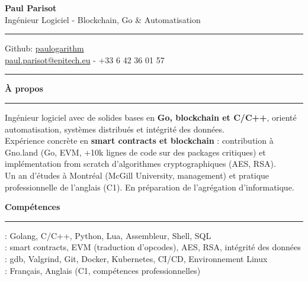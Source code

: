 \documentclass[9pt]{extarticle}
\begin{document}
\begin{center}
	{\huge\bfseries Paul Parisot}
	\\[4pt]
	{\Large Ingénieur Logiciel - Blockchain, Go \& Automatisation}
	\\
\end{center}

\par\vspace{-5pt}
\rule{\linewidth}{0.4pt}
\par\vspace{-5pt}

\begin{center}
	Github: \href{https://github.com/paulogarithm}{paulogarithm}
	\\
	\href{mailto:paul.parisot@epitech.eu}{paul.parisot@epitech.eu} - +33 6 42 36 01 57
	\\
\end{center}

\par\vspace{-10pt}
\rule{\linewidth}{0.4pt}
\par\vspace{7pt}

{\large\bfseries À propos}
\par\vspace{-8pt}
\rule{\linewidth}{0.4pt}
\par\vspace{5pt}

Ingénieur logiciel avec de solides bases en {\bfseries Go, blockchain et C/C++}, orienté automatisation, systèmes distribués et intégrité des données.
\\
Expérience concrète en {\bfseries smart contracts et blockchain} : contribution à Gno.land (Go, EVM, +10k lignes de code sur des packages critiques) et implémentation from scratch d'algorithmes cryptographiques (AES, RSA).
\\
Un an d'études à Montréal (McGill University, management) et pratique professionnelle de l'anglais (C1). En préparation de l'agrégation d'informatique.
\par\vspace{5pt}

{\large\bfseries Compétences}
\par\vspace{-8pt}
\rule{\linewidth}{0.4pt}
\par\vspace{5pt}

\hspace*{5pt}{\bfseries Maîtrise}: Golang, C/C++, Python, Lua, Assembleur, Shell, SQL
\\
\hspace*{5pt}{\bfseries Blockchain \& Crypto}: smart contracts, EVM (traduction d'opcodes), AES, RSA, intégrité des données
\\
\hspace*{5pt}{\bfseries Outils}: gdb, Valgrind, Git, Docker, Kubernetes, CI/CD, Environnement Linux
\\
\hspace*{5pt}{\bfseries Langues}: Français, Anglais (C1, compétences professionnelles)
\end{document}
